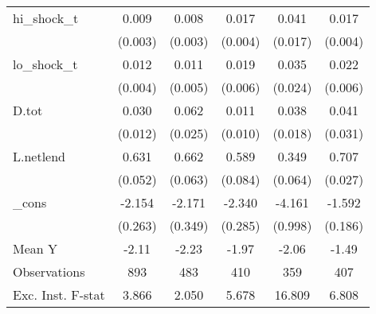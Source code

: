 {\begin{tabular}{l*{5}{c}}
\addlinespace
hi\_shock\_t  &       0.009\sym{***}&       0.008\sym{**} &       0.017\sym{***}&       0.041\sym{**} &       0.017\sym{***}\\
            &     (0.003)         &     (0.003)         &     (0.004)         &     (0.017)         &     (0.004)         \\
\addlinespace
lo\_shock\_t  &       0.012\sym{***}&       0.011\sym{**} &       0.019\sym{***}&       0.035         &       0.022\sym{***}\\
            &     (0.004)         &     (0.005)         &     (0.006)         &     (0.024)         &     (0.006)         \\
\addlinespace
D.tot       &       0.030\sym{**} &       0.062\sym{**} &       0.011         &       0.038\sym{*}  &       0.041         \\
            &     (0.012)         &     (0.025)         &     (0.010)         &     (0.018)         &     (0.031)         \\
\addlinespace
L.netlend   &       0.631\sym{***}&       0.662\sym{***}&       0.589\sym{***}&       0.349\sym{***}&       0.707\sym{***}\\
            &     (0.052)         &     (0.063)         &     (0.084)         &     (0.064)         &     (0.027)         \\
\addlinespace
\_cons      &      -2.154\sym{***}&      -2.171\sym{***}&      -2.340\sym{***}&      -4.161\sym{***}&      -1.592\sym{***}\\
            &     (0.263)         &     (0.349)         &     (0.285)         &     (0.998)         &     (0.186)         \\
\midrule
Mean Y      &       -2.11         &       -2.23         &       -1.97         &       -2.06         &       -1.49         \\
Observations&         893         &         483         &         410         &         359         &         407         \\
Exc. Inst. F-stat&       3.866         &       2.050         &       5.678         &      16.809         &       6.808         \\
\bottomrule
\end{tabular}
}
